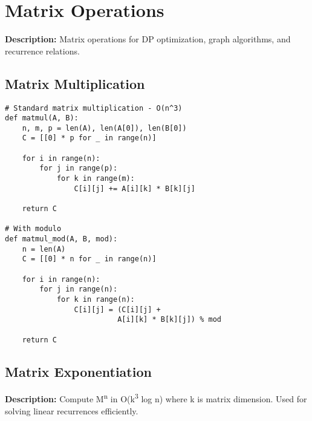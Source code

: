 \section{Matrix Operations}

\textbf{Description:} Matrix operations for DP optimization, graph algorithms, and recurrence relations.

\subsection{Matrix Multiplication}
\begin{lstlisting}
# Standard matrix multiplication - O(n^3)
def matmul(A, B):
    n, m, p = len(A), len(A[0]), len(B[0])
    C = [[0] * p for _ in range(n)]
    
    for i in range(n):
        for j in range(p):
            for k in range(m):
                C[i][j] += A[i][k] * B[k][j]
    
    return C

# With modulo
def matmul_mod(A, B, mod):
    n = len(A)
    C = [[0] * n for _ in range(n)]
    
    for i in range(n):
        for j in range(n):
            for k in range(n):
                C[i][j] = (C[i][j] + 
                          A[i][k] * B[k][j]) % mod
    
    return C
\end{lstlisting}

\subsection{Matrix Exponentiation}
\textbf{Description:} Compute M\textsuperscript{n} in O(k\textsuperscript{3} log n) where k is matrix dimension. Used for solving linear recurrences efficiently.

